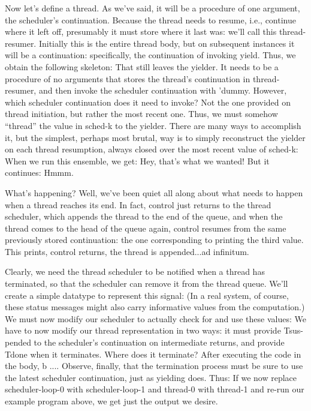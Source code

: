 Now let’s define a thread. As we’ve said, it will be a procedure of one
argument, the scheduler’s continuation. Because the thread needs to resume,
i.e., continue where it left off, presumably it must store where it last was:
we’ll call this thread-resumer. Initially this is the entire thread body, but on
subsequent instances it will be a continuation: specifically, the continuation
of invoking yield. Thus, we obtain the following skeleton:
That still leaves the yielder. It needs to be a procedure of no arguments that
stores the thread’s continuation in thread-resumer, and then invoke the
scheduler continuation with 'dummy. However, which scheduler continuation does
it need to invoke? Not the one provided on thread initiation, but rather the
most recent one. Thus, we must somehow “thread” the value in sched-k to the
yielder. There are many ways to accomplish it, but the simplest, perhaps most
brutal, way is to simply reconstruct the yielder on each thread resumption,
always closed over the most recent value of sched-k:
When we run this ensemble, we get:
Hey, that’s what we wanted! But it continues:
Hmmm.

What’s happening? Well, we’ve been quiet all along about what needs to happen
when a thread reaches its end. In fact, control just returns to the thread
scheduler, which appends the thread to the end of the queue, and when the thread
comes to the head of the queue again, control resumes from the same previously
stored continuation: the one corresponding to printing the third value. This
prints, control returns, the thread is appended...ad infinitum.

Clearly, we need the thread scheduler to be notified when a thread has
terminated, so that the scheduler can remove it from the thread queue. We’ll
create a simple datatype to represent this signal:
(In a real system, of course, these status messages might also carry informative
values from the computation.) We must now modify our scheduler to actually check
for and use these values:
We have to now modify our thread representation in two ways: it must provide
Tsus- pended to the scheduler’s continuation on intermediate returns, and
provide Tdone when it terminates. Where does it terminate? After executing the
code in the body, b .... Observe, finally, that the termination process must be
sure to use the latest scheduler continuation, just as yielding does. Thus:
If we now replace scheduler-loop-0 with scheduler-loop-1 and thread-0 with
thread-1 and re-run our example program above, we get just the output we desire.
